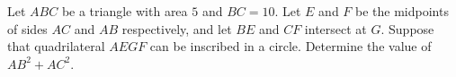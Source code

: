 Let $ABC$ be a triangle with area $5$ and $BC = 10$. Let $E$ and $F$ be the midpoints of sides $AC$ and $AB$ respectively, and let $BE$ and $CF$ intersect at $G$. Suppose that quadrilateral $AEGF$ can be inscribed in a circle. Determine the value of $AB^2+AC^2$.
